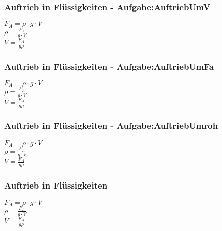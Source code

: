 \subsubsection{Auftrieb in Flüssigkeiten - Aufgabe:AuftriebUmV} 
\begin{minipage}{0.45\textwidth} 
$ F_{A}  =  \rho \cdot g\cdot V $\\ 
$ \rho  = \frac{F_{A} }{g\cdot V} $\\ 
$ V = \frac{F_{A} }{g \rho } $\\ 
\end{minipage} 
\begin{minipage}{0.45\textwidth} 
 
\end{minipage} 
\subsubsection{Auftrieb in Flüssigkeiten - Aufgabe:AuftriebUmFa} 
\begin{minipage}{0.45\textwidth} 
$ F_{A}  =  \rho \cdot g\cdot V $\\ 
$ \rho  = \frac{F_{A} }{g\cdot V} $\\ 
$ V = \frac{F_{A} }{g \rho } $\\ 
\end{minipage} 
\begin{minipage}{0.45\textwidth} 
 
\end{minipage} 
\subsubsection{Auftrieb in Flüssigkeiten - Aufgabe:AuftriebUmroh} 
\begin{minipage}{0.45\textwidth} 
$ F_{A}  =  \rho \cdot g\cdot V $\\ 
$ \rho  = \frac{F_{A} }{g\cdot V} $\\ 
$ V = \frac{F_{A} }{g \rho } $\\ 
\end{minipage} 
\begin{minipage}{0.45\textwidth} 
 
\end{minipage} 
\subsubsection{Auftrieb in Flüssigkeiten} 
\begin{minipage}{0.45\textwidth} 
$ F_{A}  =  \rho \cdot g\cdot V $\\ 
$ \rho  = \frac{F_{A} }{g\cdot V} $\\ 
$ V = \frac{F_{A} }{g \rho } $\\ 
\end{minipage} 
\begin{minipage}{0.45\textwidth} 
 
\end{minipage} 
